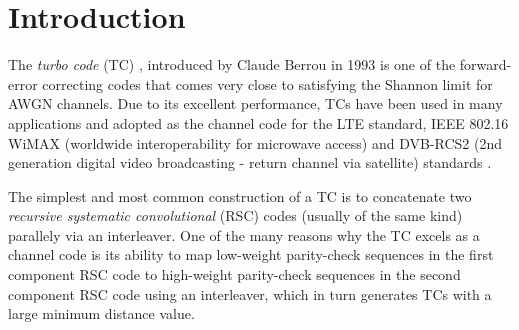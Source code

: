 \section{Introduction}

The {\it turbo code} (TC) \cite{ref1}, introduced by Claude Berrou in 1993 is one of the forward-error correcting codes that comes very close to satisfying the Shannon limit for AWGN channels.  Due to its excellent performance, TCs have been used in many applications and  adopted as the channel code for the LTE standard, IEEE 802.16 WiMAX (worldwide interoperability for microwave access) and DVB-RCS2 (2nd generation digital video broadcasting - return channel via satellite) standards \cite{ref7}.

 The simplest and most common construction of a TC is  to concatenate  two {\it recursive systematic convolutional} (RSC) codes (usually of the same kind) parallely  via an interleaver. One of the many reasons why the TC excels as a channel code is its ability to map low-weight parity-check sequences in the first component RSC code to high-weight parity-check sequences in the second component RSC code using an interleaver, which in turn generates TCs with a large minimum distance value.


